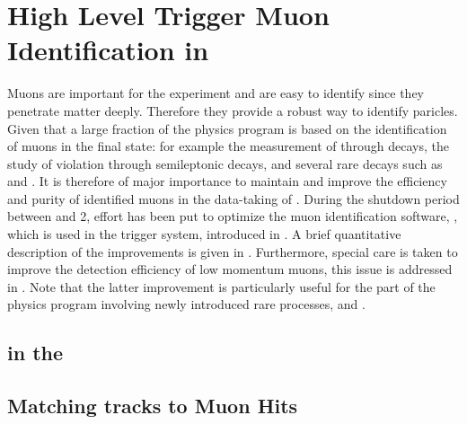 \chapter{High Level Trigger Muon Identification in \runtwo}
\label{Muon_id_hlt}

Muons are important for the \lhcb experiment and are easy to identify since they penetrate matter deeply.
Therefore they provide a robust way to identify \jpsi paricles. Given that a large fraction of the \lhcb physics
program is based on the identification of muons in the final state: for example the measurement of \phis through
\BsJpsiPhi decays, the study of \CP violation through semileptonic decays, and several rare decays such as
\BdKstmumu and \Bsmm. It is therefore of major importance to maintain and improve the efficiency and purity of identified muons in
the \runtwo data-taking of \lhcb. During the shutdown period between \runone and 2, effort has been put to
optimize the muon identification software, \muonID, which is used in the \lhcb trigger system, introduced in .
A brief quantitative description of the \muonID improvements is given in .
Furthermore, special care is taken to improve the detection efficiency of low momentum muons, this issue is
addressed in . Note that the latter improvement is particularly useful for the part
of the \lhcb physics program involving newly introduced rare processes, \eg \Sigmapmumu \cite{LHCB-CONF-2016-013-001} and \Ksmumu \cite{LHCb-CONF-2016-012}.

\section{\hltone \muonID in the \lhc \runtwo}
\label{muid_hlt1}


\section{Matching \velo tracks to Muon Hits}
\label{mvm_algorrithm}

